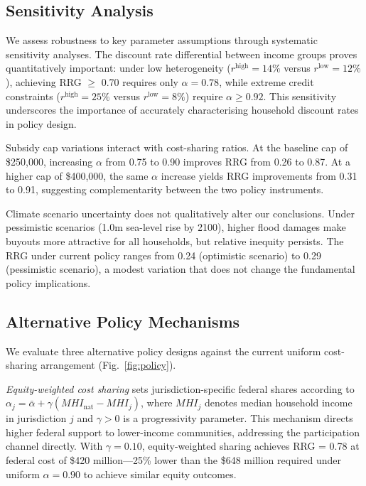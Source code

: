 \documentclass[preprint,12pt,authoryear]{elsarticle}
\begin{document}
\subsection{Sensitivity Analysis}

We assess robustness to key parameter assumptions through systematic sensitivity analyses. The discount rate differential between income groups proves quantitatively important: under low heterogeneity ($r^{\text{high}} = 14\%$ versus $r^{\text{low}} = 12\%$), achieving RRG $\geq$ 0.70 requires only $\alpha = 0.78$, while extreme credit constraints ($r^{\text{high}} = 25\%$ versus $r^{\text{low}} = 8\%$) require $\alpha \geq 0.92$. This sensitivity underscores the importance of accurately characterising household discount rates in policy design.

Subsidy cap variations interact with cost-sharing ratios. At the baseline cap of \$250,000, increasing $\alpha$ from 0.75 to 0.90 improves RRG from 0.26 to 0.87. At a higher cap of \$400,000, the same $\alpha$ increase yields RRG improvements from 0.31 to 0.91, suggesting complementarity between the two policy instruments.

Climate scenario uncertainty does not qualitatively alter our conclusions. Under pessimistic scenarios (1.0m sea-level rise by 2100), higher flood damages make buyouts more attractive for all households, but relative inequity persists. The RRG under current policy ranges from 0.24 (optimistic scenario) to 0.29 (pessimistic scenario), a modest variation that does not change the fundamental policy implications.

\subsection{Alternative Policy Mechanisms}

We evaluate three alternative policy designs against the current uniform cost-sharing arrangement (Fig.~\ref{fig:policy}).

\textit{Equity-weighted cost sharing} sets jurisdiction-specific federal shares according to $\alpha_j = \bar{\alpha} + \gamma(MHI_{\text{nat}} - MHI_j)$, where $MHI_j$ denotes median household income in jurisdiction $j$ and $\gamma > 0$ is a progressivity parameter. This mechanism directs higher federal support to lower-income communities, addressing the participation channel directly. With $\gamma = 0.10$, equity-weighted sharing achieves RRG = 0.78 at federal cost of \$420 million---25\% lower than the \$648 million required under uniform $\alpha = 0.90$ to achieve similar equity outcomes.
\end{document}
